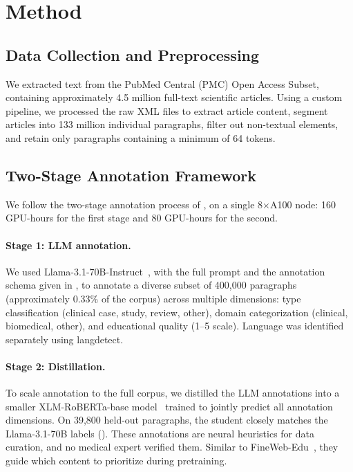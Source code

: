 \section{Method}

\subsection{Data Collection and Preprocessing}
\label{sec:data-collection}

\begin{reviewread}
We extracted text from the PubMed Central (PMC) Open Access Subset, containing approximately 4.5 million full-text scientific articles. Using a custom pipeline, we processed the raw XML files to extract article content, segment articles into 133 million individual paragraphs, filter out non-textual elements, and retain only paragraphs containing a minimum of 64 tokens.
\end{reviewread}

\subsection{Two-Stage Annotation Framework}
\label{sec:annotation}

\begin{reviewread}
We follow the two-stage annotation process of , on a single 8$\times$A100 node: 160 GPU-hours for the first stage and 80 GPU-hours for the second.
\end{reviewread}

\paragraph{Stage 1: LLM annotation.}
We used Llama-3.1-70B-Instruct~\citep{touvron2024llama3}, with the full prompt and the annotation schema given in , to annotate a diverse subset of 400,000 paragraphs (approximately 0.33\% of the corpus) across multiple dimensions: type classification (clinical case, study, review, other), domain categorization (clinical, biomedical, other), and educational quality (1--5 scale). Language was identified separately using langdetect.

\paragraph{Stage 2: Distillation.}
To scale annotation to the full corpus, we distilled the LLM annotations into a smaller XLM-RoBERTa-base model~\citep{conneau2020xlmr} trained to jointly predict all annotation dimensions. On 39,800 held-out paragraphs, the student closely matches the Llama-3.1-70B labels (). These annotations are neural heuristics for data curation, and no medical expert verified them. Similar to FineWeb-Edu~\citep{penedo2024fineweb}, they guide which content to prioritize during pretraining.


